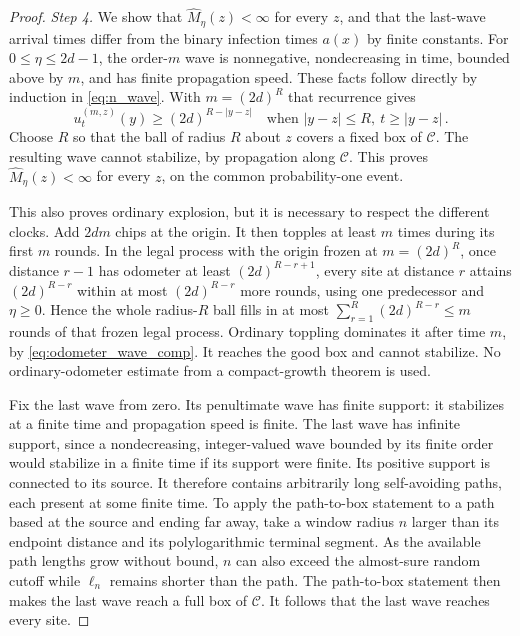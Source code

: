 \documentclass[12pt]{amsart}
\begin{document}
\begin{proof}
\emph{Step 4.} We show that $\hat M_\eta(z)<\infty$ for every $z$, and that the last-wave arrival times differ from the binary infection times $a(x)$ by finite constants. For $0\leq\eta\leq2d-1$, the order-$m$ wave is nonnegative, nondecreasing in time, bounded above by $m$, and has finite propagation speed. These facts follow directly by induction in \eqref{eq:n_wave}. With $m=(2d)^R$ that recurrence gives
\begin{equation*}
 u_t^{(m,z)}(y)\geq(2d)^{R-|y-z|}
 \quad\text{when }|y-z|\leq R,\ t\geq|y-z|\,.
\end{equation*}
Choose $R$ so that the ball of radius $R$ about $z$ covers a fixed box of $\mathcal C$. The resulting wave cannot stabilize, by propagation along $\mathcal C$. This proves $\hat M_\eta(z)<\infty$ for every $z$, on the common probability-one event.

This also proves ordinary explosion, but it is necessary to respect the different clocks. Add $2dm$ chips at the origin. It then topples at least $m$ times during its first $m$ rounds. In the legal process with the origin frozen at $m=(2d)^R$, once distance $r-1$ has odometer at least $(2d)^{R-r+1}$, every site at distance $r$ attains $(2d)^{R-r}$ within at most $(2d)^{R-r}$ more rounds, using one predecessor and $\eta\geq0$. Hence the whole radius-$R$ ball fills in at most $\sum_{r=1}^R(2d)^{R-r}\leq m$ rounds of that frozen legal process. Ordinary toppling dominates it after time $m$, by \eqref{eq:odometer_wave_comp}. It reaches the good box and cannot stabilize. No ordinary-odometer estimate from a compact-growth theorem is used.

Fix the last wave from zero. Its penultimate wave has finite support: it stabilizes at a finite time and propagation speed is finite. The last wave has infinite support, since a nondecreasing, integer-valued wave bounded by its finite order would stabilize in a finite time if its support were finite. Its positive support is connected to its source. It therefore contains arbitrarily long self-avoiding paths, each present at some finite time. To apply the path-to-box statement to a path based at the source and ending far away, take a window radius $n$ larger than its endpoint distance and its polylogarithmic terminal segment. As the available path lengths grow without bound, $n$ can also exceed the almost-sure random cutoff while $\ell_n$ remains shorter than the path. The path-to-box statement then makes the last wave reach a full box of $\mathcal C$. It follows that the last wave reaches every site.


\end{proof}
\end{document}
